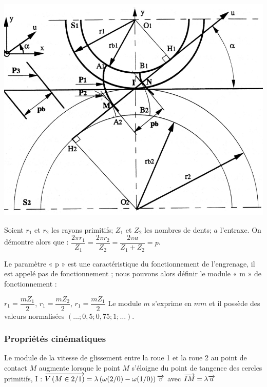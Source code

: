 \documentclass[11pt,oneside]{article}
\begin{document}
\begin{minipage}[c]{.4\linewidth}
\begin{center}
\includegraphics[width=.9\textwidth]{png/fig_58}
\end{center}

\end{minipage} \hfill
\begin{minipage}[c]{.55\linewidth}
Soient $r_1$ et $r_2$ les rayons primitifs; $Z_1$ et $Z_2$ les nombres de dents; $a$ l’entraxe.
On démontre alors que : $\dfrac{2\pi r_1}{Z_1}=\dfrac{2\pi r_2}{Z_2}=\dfrac{2\pi a}{Z_1+Z_2}=p$.

Le paramètre « p » est une caractéristique du fonctionnement de l’engrenage, il est appelé pas de fonctionnement ; nous pouvons alors définir le module « m » de fonctionnement :

$r_1=\dfrac{mZ_1}{2}$, $r_1=\dfrac{mZ_2}{2}$, $r_1=\dfrac{mZ_1}{2}$
Le module $m$ s’exprime en $mm$ et il possède des valeurs normalisées $(… ; 0,5 ; 0,75 ; 1 ; …)$.

\end{minipage}

\subsubsection{Propriétés cinématiques}
Le module de la vitesse de glissement entre la roue 1 et la roue 2 au point de contact $M$ augmente lorsque le point $M$ s’éloigne du point de tangence des cercles primitifs, I :
$\overrightarrow{V\left( {M} \in {2}/{1}\right)}=\lambda\left(\omega(2/0)-\omega(1/0) \right)\overrightarrow{v}$ avec $\overrightarrow{IM} = \lambda \overrightarrow{u}$
\end{document}

